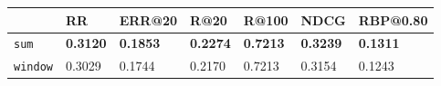 \begin{tabular}{lllllll}
    \toprule
    {} & RR & ERR@20 & R@20 & R@100 & NDCG & RBP@0.80 \\
    \midrule
    \texttt{sum}    & \textbf{0.3120} & \textbf{0.1853} & \textbf{0.2274} & \textbf{0.7213} & \textbf{0.3239} & \textbf{0.1311} \\
    \texttt{window} & 0.3029 & 0.1744 & 0.2170 & 0.7213 & 0.3154 & 0.1243 \\
    \bottomrule
\end{tabular}